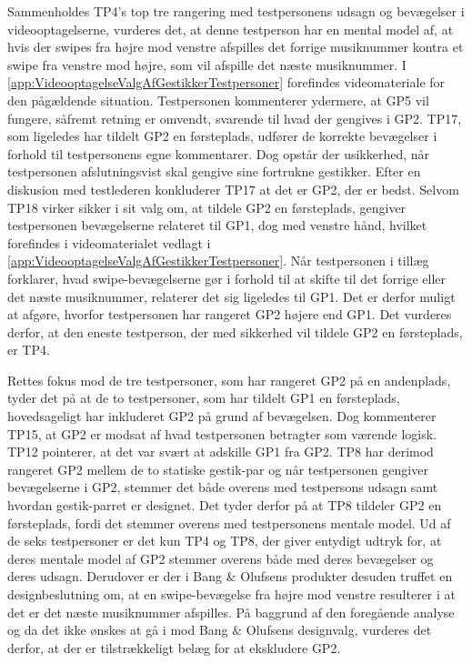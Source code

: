\noindent
%
Sammenholdes TP4's top tre rangering med testpersonens udsagn og bevægelser i videooptagelserne, vurderes det, at denne testperson har en mental model af, at hvis der swipes fra højre mod venstre afspilles det forrige musiknummer kontra et swipe fra venstre mod højre, som vil afspille det næste musiknummer. I \autoref{app:VideooptagelseValgAfGestikkerTestpersoner} forefindes videomateriale for den pågældende situation. Testpersonen kommenterer ydermere, at GP5 vil fungere, såfremt retning er omvendt, svarende til hvad der gengives i GP2. TP17, som ligeledes har tildelt GP2 en førsteplads, udfører de korrekte bevægelser i forhold til testpersonens egne kommentarer. Dog opstår der usikkerhed, når testpersonen afslutningsvist skal gengive sine fortrukne gestikker. Efter en diskusion med testlederen konkluderer TP17 at det er GP2, der er bedst. Selvom TP18 virker sikker i sit valg om, at tildele GP2 en førsteplads, gengiver testpersonen bevægelserne relateret til GP1, dog med venstre hånd, hvilket forefindes i videomaterialet vedlagt i \autoref{app:VideooptagelseValgAfGestikkerTestpersoner}. Når testpersonen i tillæg forklarer, hvad swipe-bevægelserne gør i forhold til at skifte til det forrige eller det næste musiknummer, relaterer det sig ligeledes til GP1. Det er derfor muligt at afgøre, hvorfor testpersonen har rangeret GP2 højere end GP1. Det vurderes derfor, at den eneste testperson, der med sikkerhed vil tildele GP2 en førsteplads, er TP4. 

Rettes fokus mod de tre testpersoner, som har rangeret GP2 på en andenplads, tyder det på at de to testpersoner, som har tildelt GP1 en førsteplads, hovedsageligt har inkluderet GP2 på grund af bevægelsen. Dog kommenterer TP15, at GP2 er modsat af hvad testpersonen betragter som værende logisk. TP12 pointerer, at det var svært at adskille GP1 fra GP2. TP8 har derimod rangeret GP2 mellem de to statiske gestik-par og når testpersonen gengiver bevægelserne i GP2, stemmer det både overens med testpersons udsagn samt hvordan gestik-parret er designet. Det tyder derfor på at TP8 tildeler GP2 en førsteplads, fordi det stemmer overens med testpersonens mentale model.\blankline 
%
Ud af de seks testpersoner er det kun TP4 og TP8, der giver entydigt udtryk for, at deres mentale model af GP2 stemmer overens både med deres bevægelser og deres udsagn. Derudover er der i Bang $\&$ Olufsens produkter desuden truffet en designbeslutning om, at en swipe-bevægelse fra højre mod venstre resulterer i at det er det næste musiknummer afspilles. På baggrund af den foregående analyse og da det ikke ønskes at gå i mod Bang $\&$ Olufsens designvalg, vurderes det derfor, at der er tilstrækkeligt belæg for at ekskludere GP2. 

